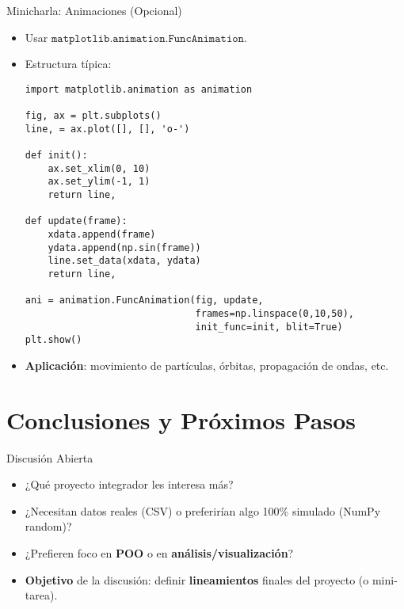 \documentclass[10pt]{beamer}
\begin{document}
\begin{frame}[fragile]{Minicharla: Animaciones (Opcional)}
\begin{itemize}
  \item Usar \(\texttt{matplotlib.animation.FuncAnimation}\).
  \item Estructura típica:
\begin{verbatim}
import matplotlib.animation as animation

fig, ax = plt.subplots()
line, = ax.plot([], [], 'o-')

def init():
    ax.set_xlim(0, 10)
    ax.set_ylim(-1, 1)
    return line,

def update(frame):
    xdata.append(frame)
    ydata.append(np.sin(frame))
    line.set_data(xdata, ydata)
    return line,

ani = animation.FuncAnimation(fig, update,
                              frames=np.linspace(0,10,50),
                              init_func=init, blit=True)
plt.show()
\end{verbatim}
  \item \textbf{Aplicación}: movimiento de partículas, órbitas, propagación de ondas, etc.
\end{itemize}
\end{frame}

\section{Conclusiones y Próximos Pasos}

\begin{frame}{Discusión Abierta}
  \begin{itemize}
    \item ¿Qué proyecto integrador les interesa más?
    \item ¿Necesitan datos reales (CSV) o preferirían algo 100\% simulado (NumPy random)?
    \item ¿Prefieren foco en \textbf{POO} o en \textbf{análisis/visualización}?
    \item \textbf{Objetivo} de la discusión: definir \textbf{lineamientos} finales del proyecto (o mini-tarea).
  \end{itemize}
\end{frame}
\end{document}
